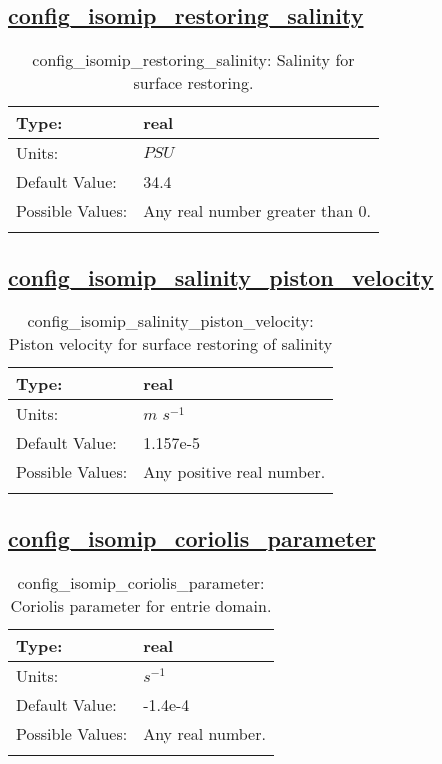 \subsection[config\_isomip\_restoring\_salinity]{\hyperref[sec:nm_tab_isomip]{config\_isomip\_restoring\_salinity}}
\label{subsec:nm_sec_config_isomip_restoring_salinity}
\begin{center}
\begin{longtable}{| p{2.0in} || p{4.0in} |}
    \hline
    Type: & real \\
    \hline
    Units: & $PSU$ \\
    \hline
    Default Value: & 34.4 \\
    \hline
    Possible Values: & Any real number greater than 0. \\
    \hline
    \caption{config\_isomip\_restoring\_salinity: Salinity for surface restoring.}
\end{longtable}
\end{center}
\subsection[config\_isomip\_salinity\_piston\_velocity]{\hyperref[sec:nm_tab_isomip]{config\_isomip\_salinity\_piston\_velocity}}
\label{subsec:nm_sec_config_isomip_salinity_piston_velocity}
\begin{center}
\begin{longtable}{| p{2.0in} || p{4.0in} |}
    \hline
    Type: & real \\
    \hline
    Units: & $m$ $s^{-1}$ \\
    \hline
    Default Value: & 1.157e-5 \\
    \hline
    Possible Values: & Any positive real number. \\
    \hline
    \caption{config\_isomip\_salinity\_piston\_velocity: Piston velocity for surface restoring of salinity}
\end{longtable}
\end{center}
\subsection[config\_isomip\_coriolis\_parameter]{\hyperref[sec:nm_tab_isomip]{config\_isomip\_coriolis\_parameter}}
\label{subsec:nm_sec_config_isomip_coriolis_parameter}
\begin{center}
\begin{longtable}{| p{2.0in} || p{4.0in} |}
    \hline
    Type: & real \\
    \hline
    Units: & $s^{-1}$ \\
    \hline
    Default Value: & -1.4e-4 \\
    \hline
    Possible Values: & Any real number. \\
    \hline
    \caption{config\_isomip\_coriolis\_parameter: Coriolis parameter for entrie domain.}
\end{longtable}
\end{center}
